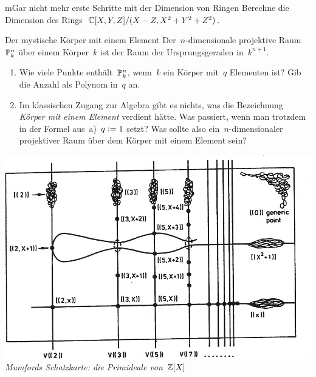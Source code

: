 \documentclass{uebblatt}
\begin{document}
\begin{aufgabe}{m}{Gar nicht mehr erste Schritte mit der Dimension von Ringen}
Berechne die Dimension des Rings~$\mathbb{C}[X,Y,Z]/(X-Z, X^2+Y^2+Z^2)$.
\end{aufgabe}

\begin{aufgabe}{0}{Der mystische Körper mit einem Element}
\scriptsize
Der~$n$-dimensionale projektive Raum~$\mathbb{P}^n_k$ über einem Körper~$k$ ist der
Raum der Ursprungsgeraden in~$k^{n+1}$.
\begin{enumerate}
\item Wie viele Punkte enthält~$\mathbb{P}^n_k$, wenn~$k$ ein Körper mit~$q$
Elementen ist? Gib die Anzahl als Polynom in~$q$ an.
\item Im klassischen Zugang zur Algebra gibt es nichts, was die Bezeichnung
\emph{Körper mit einem Element} verdient hätte. Was passiert, wenn man trotzdem
in der Formel aus~a)~$q \vcentcolon= 1$ setzt? Was sollte also ein~$n$-dimensionaler
projektiver Raum über dem Körper mit einem Element sein?
\end{enumerate}
\end{aufgabe}

\centering
\href{http://www.neverendingbooks.org/mumfords-treasure-map}{\includegraphics[scale=0.2]{images/mumfords-treasure-map}} \\[0.5em]
\small
\emph{Mumfords Schatzkarte: die Primideale von~$\mathbb{Z}[X]$}
\end{document}
